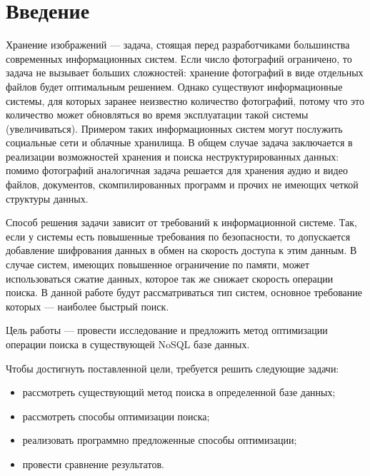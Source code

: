 \chapter*{Введение}

Хранение изображений --- задача, стоящая перед разработчиками большинства современных информационных систем. Если число фотографий ограничено, то задача не вызывает больших сложностей: хранение фотографий в виде отдельных файлов будет оптимальным решением. Однако существуют информационные системы, для которых заранее неизвестно количество фотографий, потому что это количество может обновляться во время эксплуатации такой системы (увеличиваться). Примером таких информационных систем могут послужить социальные сети и облачные хранилища. В общем случае задача заключается в реализации возможностей хранения и поиска неструктурированных данных: помимо фотографий аналогичная задача решается для хранения аудио и видео файлов, документов, скомпилированных программ и прочих не имеющих четкой структуры данных.

Способ решения задачи зависит от требований к информационной системе. Так, если у системы есть повышенные требования по безопасности, то допускается добавление шифрования данных в обмен на скорость доступа к этим данным. В случае систем, имеющих повышенное ограничение по памяти, может использоваться сжатие данных, которое так же снижает скорость операции поиска. В данной работе будут рассматриваться тип систем, основное требование которых --- наиболее быстрый поиск.

Цель работы --- провести исследование и предложить метод оптимизации операции поиска в существующей NoSQL базе данных.

Чтобы достигнуть поставленной цели, требуется решить следующие задачи:
\begin{itemize}
    \item рассмотреть существующий метод поиска в определенной базе данных;
    \item рассмотреть способы оптимизации поиска;
    \item реализовать программно предложенные способы оптимизации;
    \item провести сравнение результатов.
\end{itemize}
